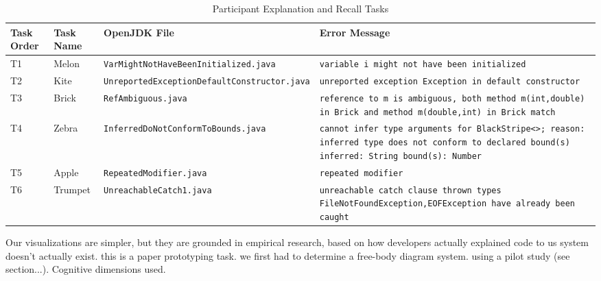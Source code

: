 \documentclass[conference]{IEEEtran}
\begin{document}
\begin{table}[!t]
\caption{Participant Explanation and Recall Tasks\label{tab:tasks}}
\centering
\begin{tabularx}{\textwidth}{lllX}
\toprule
Task Order & Task Name & OpenJDK File & Error Message\\
\midrule

T1 & Melon & \texttt{VarMightNotHaveBeenInitialized.java} & \texttt{variable i might not have been initialized} \\
[0.2cm]
\midrule

T2 & Kite & \texttt{UnreportedExceptionDefaultConstructor.java} & \texttt{unreported exception Exception in default constructor} \\
[0.2cm]
\midrule

T3 & Brick & \texttt{RefAmbiguous.java} & \texttt{reference to m is ambiguous, both method m(int,double) in Brick and method m(double,int) in Brick match}\\
[0.2cm]
\midrule

T4 & Zebra & \texttt{InferredDoNotConformToBounds.java} & \texttt{cannot infer type arguments for BlackStripe<>;\newline
reason: inferred type does not conform to declared bound(s)\newline\newline
inferred: String\newline
    bound(s): Number}\\
[0.2cm]
\midrule

T5 & Apple & \texttt{RepeatedModifier.java} & \texttt{repeated modifier
}\\
[0.2cm]
\midrule

T6 & Trumpet & \texttt{UnreachableCatch1.java} & \texttt{unreachable catch clause\newline     
  thrown types FileNotFoundException,EOFException have already been caught
}\\
[0.2cm]

\bottomrule
\end{tabularx}
\end{table}

Our visualizations are simpler, but they are grounded in empirical research, based on how developers actually explained code to us system doesn't actually exist. this is a paper prototyping task. we first had to determine a free-body diagram system. using a pilot study (see section...). Cognitive dimensions used.  
\end{document}
